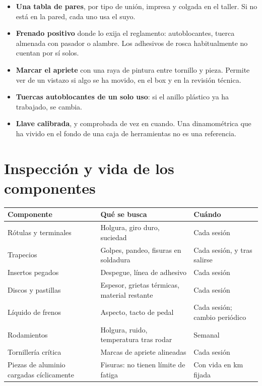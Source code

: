 \begin{itemize}
  \item \textbf{Una tabla de pares}, por tipo de unión, impresa y colgada en el
        taller. Si no está en la pared, cada uno usa el suyo.
  \item \textbf{Frenado positivo} donde lo exija el reglamento: autoblocantes,
        tuerca almenada con pasador o alambre. Los adhesivos de rosca
        habitualmente no cuentan por sí solos.
  \item \textbf{Marcar el apriete} con una raya de pintura entre tornillo y
        pieza. Permite ver de un vistazo si algo se ha movido, en el box y en la
        revisión técnica.
  \item \textbf{Tuercas autoblocantes de un solo uso}: si el anillo plástico ya
        ha trabajado, se cambia.
  \item \textbf{Llave calibrada}, y comprobada de vez en cuando. Una
        dinamométrica que ha vivido en el fondo de una caja de herramientas no
        es una referencia.
\end{itemize}

\section{Inspección y vida de los componentes}
\label{sec:montaje_alineacion:04}

\begin{center}
\begin{tabularx}{\textwidth}{@{}lXl@{}}
\toprule
\textbf{Componente} & \textbf{Qué se busca} & \textbf{Cuándo} \\
\midrule
Rótulas y terminales & Holgura, giro duro, suciedad & Cada sesión \\
Trapecios & Golpes, pandeo, fisuras en soldadura & Cada sesión, y tras salirse \\
Insertos pegados & Despegue, línea de adhesivo & Cada sesión \\
Discos y pastillas & Espesor, grietas térmicas, material restante & Cada sesión \\
Líquido de frenos & Aspecto, tacto de pedal & Cada sesión; cambio periódico \\
Rodamientos & Holgura, ruido, temperatura tras rodar & Semanal \\
Tornillería crítica & Marcas de apriete alineadas & Cada sesión \\
Piezas de aluminio cargadas cíclicamente & Fisuras: no tienen límite de fatiga & Con vida en km fijada \\
\bottomrule
\end{tabularx}
\end{center}

